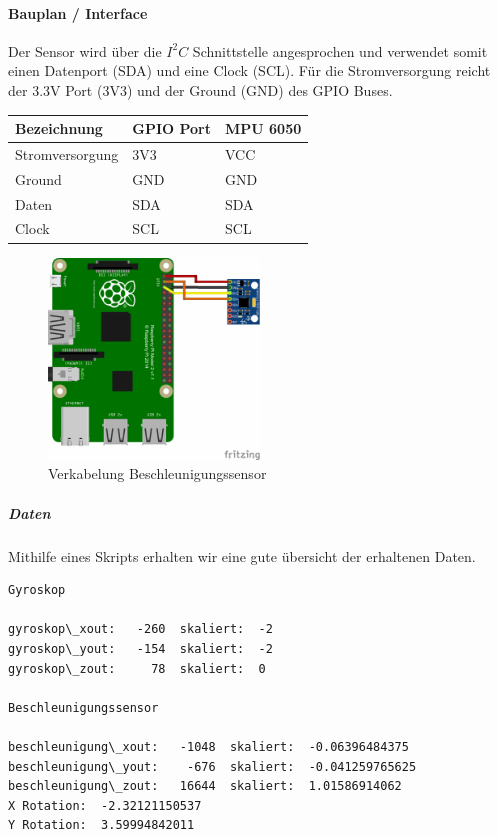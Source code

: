 \documentclass[../../main.tex]{subfiles}
\begin{document}
\paragraph{Bauplan / Interface}
Der Sensor wird über die $I^2C$ Schnittstelle angesprochen und verwendet somit einen Datenport (SDA) und eine Clock (SCL). Für die Stromversorgung reicht der 3.3V Port (3V3) und der Ground (GND) des GPIO Buses.

\begin{table}[H]
\begin{flushleft}
\begin{tabular}{lll}
Bezeichnung     & GPIO Port & MPU 6050 \\ \hline
Stromversorgung & 3V3      & VCC      \\ \hline
Ground          & GND      & GND      \\ \hline
Daten          & SDA      & SDA       \\ \hline
Clock          & SCL      & SCL       \\ \hline
\end{tabular}
\end{flushleft}
\end{table}

\begin{figure}[H] \centering
  \includegraphics[width=0.5\textwidth, angle=90]{Verkabelung_BeschlSensor}
  \caption{Verkabelung Beschleunigungssensor}
  \label{fig:Beschleunigungssensor}
\end{figure}

\subparagraph{Daten}
Mithilfe eines Skripts erhalten wir eine gute übersicht der erhaltenen Daten.

\begin{lstlisting}
Gyroskop

gyroskop\_xout:   -260  skaliert:  -2
gyroskop\_yout:   -154  skaliert:  -2
gyroskop\_zout:     78  skaliert:  0

Beschleunigungssensor

beschleunigung\_xout:   -1048  skaliert:  -0.06396484375
beschleunigung\_yout:    -676  skaliert:  -0.041259765625
beschleunigung\_zout:   16644  skaliert:  1.01586914062
X Rotation:  -2.32121150537
Y Rotation:  3.59994842011
\end{lstlisting}
\end{document}
